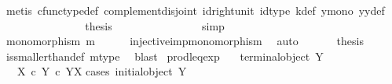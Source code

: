 \begin{isabellebody}
\ {\isacharparenleft}{\kern0pt}metis\ cfunc{\isacharunderscore}{\kern0pt}type{\isacharunderscore}{\kern0pt}def\ complement{\isacharunderscore}{\kern0pt}disjoint\ id{\isacharunderscore}{\kern0pt}right{\isacharunderscore}{\kern0pt}unit\ id{\isacharunderscore}{\kern0pt}type\ k{\isacharunderscore}{\kern0pt}def\ y{}{\isacharunderscore}{\kern0pt}mono\ y{}y{}{\isacharunderscore}{\kern0pt}def{\isacharparenleft}{\kern0pt}{}{\isacharparenright}{\kern0pt}{\isacharparenright}{\kern0pt}\isanewline
\ \ \ \ \ \ \ \ \ \ \ \ \isamarkupfalse%
\ \isamarkupfalse%
\ {\isacharquery}{\kern0pt}thesis\isanewline
\ \ \ \ \ \ \ \ \ \ \ \ \ \ \isamarkupfalse%
\ simp\isanewline
\ \ \ \ \ \ \ \ \isamarkupfalse%
\isanewline
\ \ \ \ \ \ \isamarkupfalse%
\isanewline
\ \ \ \ \isamarkupfalse%
\isanewline
\ \ \isamarkupfalse%
\isanewline
\ \ \isamarkupfalse%
\ \isamarkupfalse%
\ {\isachardoublequoteopen}monomorphism\ m{\isachardoublequoteclose}\isanewline
\ \ \ \ \isamarkupfalse%
\ injective{\isacharunderscore}{\kern0pt}imp{\isacharunderscore}{\kern0pt}monomorphism\ \isamarkupfalse%
\ auto\ \isanewline
\ \ \isamarkupfalse%
\ \isamarkupfalse%
\ {\isacharquery}{\kern0pt}thesis\isanewline
\ \ \ \ \isamarkupfalse%
\ is{\isacharunderscore}{\kern0pt}smaller{\isacharunderscore}{\kern0pt}than{\isacharunderscore}{\kern0pt}def\ m{\isacharunderscore}{\kern0pt}type\ \isamarkupfalse%
\ blast\isanewline
{}\isamarkupfalse%
%
\endisatagproof
{\isafoldproof}%
%
\isadelimproof
\isanewline
%
\endisadelimproof
\isanewline
{}\isamarkupfalse%
\ prod{\isacharunderscore}{\kern0pt}leq{\isacharunderscore}{\kern0pt}exp{\isacharcolon}{\kern0pt}\isanewline
\ \ \ {\isachardoublequoteopen}{\isasymnot}{\isacharparenleft}{\kern0pt}terminal{\isacharunderscore}{\kern0pt}object\ Y{\isacharparenright}{\kern0pt}{\isachardoublequoteclose}\isanewline
\ \ \ {\isachardoublequoteopen}{\isacharparenleft}{\kern0pt}X\ {\isasymtimes}\isactrlsub c\ Y{\isacharparenright}{\kern0pt}\ {\isasymle}\isactrlsub c\ {\isacharparenleft}{\kern0pt}Y\isactrlbsup X\isactrlesup {\isacharparenright}{\kern0pt}{\isachardoublequoteclose}\isanewline
%
\isadelimproof
%
\endisadelimproof
%
\isatagproof
{}\isamarkupfalse%
{\isacharparenleft}{\kern0pt}cases\ {\isachardoublequoteopen}initial{\isacharunderscore}{\kern0pt}object\ Y{\isachardoublequoteclose}{\isacharparenright}{\kern0pt}\isanewline

\end{isabellebody}
